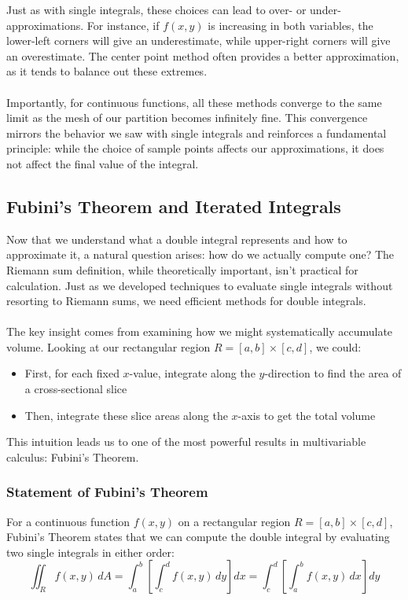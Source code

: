 \noindent Just as with single integrals, these choices can lead to over- or under-approximations. For instance, if \(f(x,y)\) is increasing in both variables, the lower-left corners will give an underestimate, while upper-right corners will give an overestimate. The center point method often provides a better approximation, as it tends to balance out these extremes. \\ \\ Importantly, for continuous functions, all these methods converge to the same limit as the mesh of our partition becomes infinitely fine. This convergence mirrors the behavior we saw with single integrals and reinforces a fundamental principle: while the choice of sample points affects our approximations, it does not affect the final value of the integral.

\subsection*{Fubini's Theorem and Iterated Integrals} 

\noindent Now that we understand what a double integral represents and how to approximate it, a natural question arises: how do we actually compute one? The Riemann sum definition, while theoretically important, isn't practical for calculation. Just as we developed techniques to evaluate single integrals without resorting to Riemann sums, we need efficient methods for double integrals. \\ \\
The key insight comes from examining how we might systematically accumulate volume. Looking at our rectangular region $R = [a,b] \times [c,d]$, we could:
\begin{itemize}
   \item First, for each fixed $x$-value, integrate along the $y$-direction to find the area of a cross-sectional slice
   \item Then, integrate these slice areas along the $x$-axis to get the total volume
\end{itemize}
This intuition leads us to one of the most powerful results in multivariable calculus: Fubini's Theorem.

\subsubsection*{Statement of Fubini's Theorem}

\noindent For a continuous function $f(x,y)$ on a rectangular region $R = [a,b] \times [c,d]$, Fubini's Theorem states that we can compute the double integral by evaluating two single integrals in either order:
\[
\iint_R f(x,y) \, dA = \int_a^b \left[\int_c^d f(x,y) \, dy\right] dx = \int_c^d \left[\int_a^b f(x,y) \, dx\right] dy
\]

